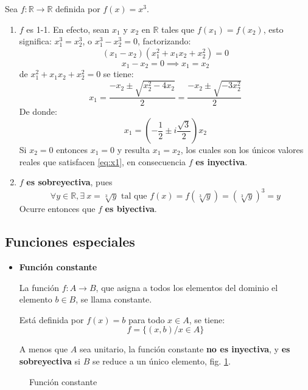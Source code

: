\begin{fmd-example}
	Sea $f: \mathbb{R} \rightarrow \mathbb{R}$ definida por $f(x) = x^3$.
	\begin{enumerate}
		\item $f$ es 1-1. En efecto, sean $x_1$ y $x_2$ en $\mathbb{R}$ tales que
		$f(x_1) = f(x_2)$, esto significa: $x_1^3 = x_2^3$, o $x_1^3 - x_2^3 = 0$,
		factorizando: \[(x_1 - x_2)(x_1^2 + x_1x_2 + x_2^2) = 0\]
		\[ x_1 - x_2 = 0 \implies x_1 = x_2 \]
		de $x_1^2 + x_1x_2 + x_2^2=0$ se tiene:
		\[ x_1 = \frac{-x_2 \pm \sqrt{x_2^2 - 4 x_2} }{2} =
		\frac{-x_2 \pm \sqrt{-3x_2^2}}{2} \]
		De donde:
		\begin{equation} \label{eq:x1}
			x_1 = \left( -\frac{1}{2} \pm i \frac{\sqrt{3}}{2} \right) x_2
		\end{equation}
		Si $x_2=0$ entonces $x_1 = 0$ y resulta $x_1 = x_2$, los cuales son los únicos
		valores reales que satisfacen \eqref{eq:x1}, en consecuencia $f$ \textbf{es inyectiva}.
		
		\item $f$ \textbf{es sobreyectiva}, pues
		\[ \forall y \in \mathbb{R}, \exists \ x = \sqrt[3]{y} \mbox{ tal que }
		f(x) = f(\sqrt[3]{y}) = \left( \sqrt[3]{y} \right)^3 = y\]
		Ocurre entonces que $f$ \textbf{es biyectiva}.
	\end{enumerate}
\end{fmd-example}

\subsection{Funciones especiales} \label{sec:especiales}
\begin{itemize}
	\item \textbf{Función constante} 
	
	La función $f: A \rightarrow B$, que asigna a todos los elementos del dominio el
	elemento $b \in B$, se llama constante.
	
	Está definida por $f(x) = b$ para todo $x \in A$, se tiene:
	\[ f = \{ (x, b) / x \in A \} \]
	
	A menos que $A$ sea unitario, la función constante \textbf{no es inyectiva}, y
	\textbf{es sobreyectiva} si $B$ se reduce a un único elemento, fig. \ref{fig:funcion_constante}.
\end{itemize}
\begin{figure}[H]
	\centering
	\caption{Función constante}
	\label{fig:funcion_constante}
\end{figure}

